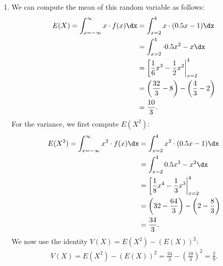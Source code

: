 {\begin{enumerate}
\begin{align*}
        \end{align*}
        \item[(e)] We can compute the mean of this random variable as follows:
        \begin{align*}
        E(X) = \int_{x=-\infty}^{\infty} x \cdot f(x) \dx &= \int_{x=2}^{4} x \cdot (0.5x-1) \dx \\
                                                        &= \int_{x=2}^{4} \cdot 0.5x^2-x \dx \\
                                                        &= \left[ \frac{1}{6}x^3 - \frac{1}{2}x^2\right|_{x=2}^4 \\
                                                        &= \left(\frac{32}{3} - 8\right) - \left(\frac{4}{3} - 2\right) \\
                                                        &= \frac{10}{3}.
        \end{align*}
        For the variance, we first compute $E(X^2)$:
        \begin{align*}
            E(X^2) = \int_{x=-\infty}^{\infty} x^2 \cdot f(x) \dx &= \int_{x=2}^{4} x^2 \cdot (0.5x-1) \dx \\
                                                            &= \int_{x=2}^{4} 0.5x^3-x^2 \dx \\
                                                            &= \left[ \frac{1}{8}x^4 - \frac{1}{3}x^3\right|_{x=2}^4 \\
                                                            &= \left(32 - \frac{64}{3}\right) - \left(2 - \frac{8}{3}\right) \\
                                                            &= \frac{34}{3}.
        \end{align*}
        We now use the identity $V(X) = E(X^2) - (E(X))^2$:
        \begin{align*}
            V(X) = E(X^2) - (E(X))^2 = \frac{34}{3} - \left(\frac{10}{3}\right)^2 = \frac{2}{9}.
        \end{align*}
    \end{enumerate}
}